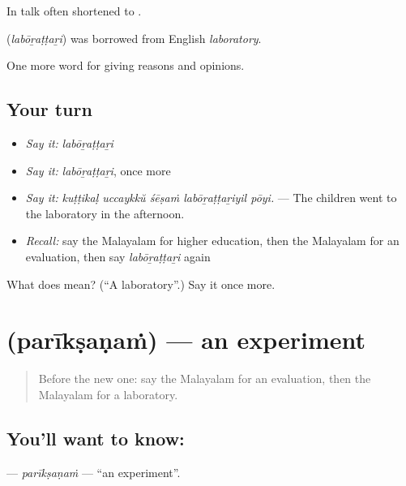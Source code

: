 In talk often shortened to .

\begin{cousinweb}
\textbf{} (\emph{labōṟaṭṭaṟi}) was borrowed from English \emph{laboratory}.
\end{cousinweb}

\begin{grammarlens}[title={What you've built}]
One more word for giving reasons and opinions.
\end{grammarlens}

\subsection*{Your turn}
\begin{itemize}
\raggedright
  \item \emph{Say it:} \emph{labōṟaṭṭaṟi}
  \item \emph{Say it:} \emph{labōṟaṭṭaṟi}, once more
  \item \emph{Say it:} \emph{kuṭṭikaḷ uccaykkŭ śēṣaṁ labōṟaṭṭaṟiyil pōyi.} — The children went to the laboratory in the afternoon.
  \item \emph{Recall:} say the Malayalam for higher education, then the Malayalam for an evaluation, then say \emph{labōṟaṭṭaṟi} again
\end{itemize}

\begin{tcolorbox}[breakable,colback=teal!4,colframe=teal!35!black,title={Before you move on}]
What does  mean? (\textquotedblleft{}A laboratory\textquotedblright{}.) Say it once more.
\end{tcolorbox}
\section[\texorpdfstring{\ml{പരീക്ഷണം} (parīkṣaṇaṁ)}{പരീക്ഷണം (parīkṣaṇaṁ)}]{ (parīkṣaṇaṁ) — an experiment}

\label{lesson:ML-C436-pariksanam}



\begin{quote}
Before the new one: say the Malayalam for an evaluation, then the Malayalam for a laboratory.
\end{quote}

\subsection*{You'll want to know: }
\textbf{} — \emph{parīkṣaṇaṁ} — \textquotedblleft{}an experiment\textquotedblright{}.

